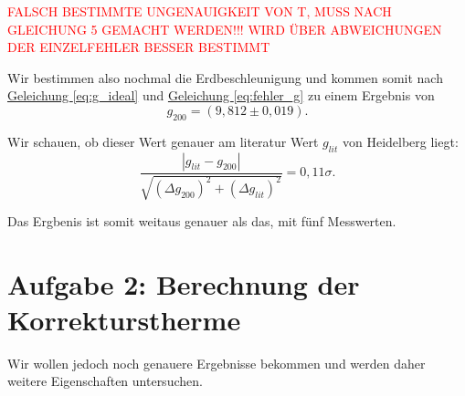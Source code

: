 \textcolor{red}{FALSCH BESTIMMTE UNGENAUIGKEIT VON T, MUSS NACH GLEICHUNG 5 GEMACHT WERDEN!!! WIRD ÜBER ABWEICHUNGEN DER EINZELFEHLER BESSER BESTIMMT}

Wir bestimmen also nochmal die Erdbeschleunigung und kommen somit nach \hyperref[eq:g_ideal]{Geleichung \ref*{eq:g_ideal}} und \hyperref[eq:fehler_g]{Geleichung \ref*{eq:fehler_g}} zu einem Ergebnis von
\begin{equation}
    \boxed{
        g_{200} = (9,812 \pm 0,019)
    }.
\end{equation}

Wir schauen, ob dieser Wert genauer am literatur Wert $g_{lit}$ von Heidelberg liegt:
\begin{equation}
    \frac{\left| g_{lit} - g_{200} \right|}{\sqrt{(\Delta g_{200})^2 + (\Delta g_{lit})^2}} = 0,11\sigma.
\end{equation}

Das Ergbenis ist somit weitaus genauer als das, mit fünf Messwerten.

\section{Aufgabe 2: Berechnung der Korrekturstherme}
Wir wollen jedoch noch genauere Ergebnisse bekommen und werden daher weitere Eigenschaften untersuchen.